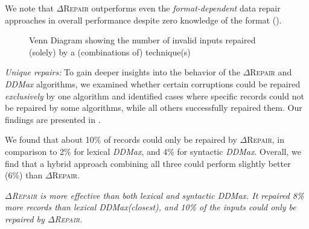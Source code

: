 \documentclass[acmsmall,screen,review,anonymous]{acmart}
\newenvironment{result}{\begin{framed}\centering\it}{\end{framed}}
\newcommand{\formatdependent}{format-dependent\xspace}
\newcommand{\dtask}{data repair\xspace}
\newcommand{\approach}{\textsc{$\Delta$Repair}\xspace}
\newcommand{\ddmax}{\textit{DDMax}\xspace}
\newcommand{\ddmaxg}{\textit{DDmaxG}\xspace}
\newcommand{\drepair}{\approach}
\begin{document}
We note that \drepair outperforms even the \emph{\formatdependent} \dtask approaches
in overall performance despite zero knowledge of the format
().

\begin{figure}[!tbp]
\centering
\caption{\centering
Venn Diagram showing the number of invalid inputs repaired (solely) by a (combinations of) technique(s) %
}
\begin{minipage}[b]{0.45\textwidth}
    \centering
\end{minipage}
\label{fig:repaircomplementarity}
\end{figure}

\noindent\emph{Unique repairs:} 
To gain deeper insights into the behavior of the \drepair and \ddmax algorithms,
we examined whether certain corruptions could be repaired \emph{exclusively} by one
algorithm and identified cases where specific records could not be repaired by
some algorithms, while all others successfully repaired them.
Our findings are presented in .

We found that about 10\% of records could only be repaired by \drepair,
in comparison to 2\% for lexical \ddmax, and 4\% for syntactic \ddmax.
Overall, we find that a hybrid approach combining all three could perform
slightly better (6\%) than \drepair.


\begin{result}
\drepair is more effective than both lexical and syntactic \ddmax.
It repaired 8\% more records than lexical \ddmax (closest),
and 10\% of the inputs could only be repaired by \drepair.
\end{result}
\end{document}
